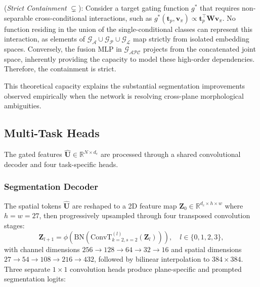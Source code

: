 \documentclass[journal]{IEEEtran}
\begin{document}
(\textit{Strict Containment} $\subsetneq$): Consider a target gating function $g^*$ that requires non-separable cross-conditional interactions, such as $g^*(\mathbf{t}_p, \mathbf{v}_\pi) \propto \mathbf{t}_p^\top \mathbf{W} \mathbf{v}_\pi$. No function residing in the union of the single-conditional classes can represent this interaction, as elements of $\mathcal{G}_{\mathcal{A}} \cup \mathcal{G}_{\mathcal{P}} \cup \mathcal{G}_{\mathcal{L}}$ map strictly from isolated embedding spaces. Conversely, the fusion MLP in $\mathcal{G}_{\mathcal{APC}}$ projects from the concatenated joint space, inherently providing the capacity to model these high-order dependencies. Therefore, the containment is strict.

This theoretical capacity explains the substantial segmentation improvements observed empirically when the network is resolving cross-plane morphological ambiguities.


\subsection{Multi-Task Heads}
\label{sec:heads}

The gated features $\hat{\mathbf{U}} \in \mathbb{R}^{N \times d_c}$ are processed through a shared convolutional decoder and four task-specific heads.

\subsubsection{Segmentation Decoder}
The spatial tokens $\hat{\mathbf{U}}$ are reshaped to a 2D feature map $\mathbf{Z}_0 \in \mathbb{R}^{d_c \times h \times w}$ where $h=w=27$, then progressively upsampled through four transposed convolution stages:
\begin{equation}
    \mathbf{Z}_{l+1} = \phi\!\left(\text{BN}\!\left(\text{ConvT}_{k=2, s=2}^{(l)}(\mathbf{Z}_l)\right)\right), \quad l \in \{0,1,2,3\},
    \label{eq:decoder}
\end{equation}
with channel dimensions $256 \to 128 \to 64 \to 32 \to 16$ and spatial dimensions $27 \to 54 \to 108 \to 216 \to 432$, followed by bilinear interpolation to $384 \times 384$.
Three separate $1 \times 1$ convolution heads produce plane-specific and prompted segmentation logits:

\end{document}

